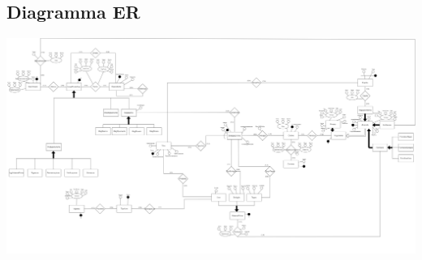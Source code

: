 \subsection{Diagramma ER}
\centerline{\includegraphics[width=18cm,keepaspectratio,angle=0]{src/progettazioneConcettuale/assests/cantina_ER.png}}